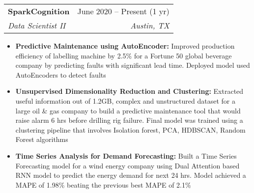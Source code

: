 \documentclass[letterpaper,12pt, margin=2in]{article}
\makeatletter
\newcommand{\resumeItem}[1]{
  \item\small{
    {#1 \vspace{-2pt}}
  }
}
\newcommand{\resumeSubheading}[4]{
  \vspace{-2pt}\item
    \begin{tabular*}{0.97\textwidth}[t]{l@{\extracolsep{\fill}}r}
      \textbf{#1} & #2 \\
      \textit{\small#3} & \textit{\small #4} \\
    \end{tabular*}\vspace{-8pt}
}
\newcommand{\resumeItemListStart}{\begin{itemize}}
\newcommand{\resumeItemListEnd}{\end{itemize}\vspace{-8pt}}
\makeatother
\begin{document}
    \resumeSubheading
      {SparkCognition}{June 2020 -- Present (1 yr)}
      {Data Scientist II}{Austin, TX}
      \resumeItemListStart
        \resumeItem{\textbf{Predictive Maintenance using AutoEncoder:} Improved production efficiency of labelling machine by 2.5\% for a Fortune 50 global beverage company by predicting faults with significant lead time. Deployed model used AutoEncoders to detect faults}
        \resumeItem{\textbf{Unsupervised Dimensionality Reduction and Clustering: }Extracted useful information out of 1.2GB, complex and unstructured dataset for a large oil & gas company to build a predictive maintenance tool that would raise alarm 6 hrs before drilling rig failure. Final model was trained using a clustering pipeline that involves Isolation forest, PCA, HDBSCAN, Random Forest algorithms}
        \resumeItem{\textbf{Time Series Analysis for Demand Forecasting: }Built a Time Series Forecasting model for a wind energy company using Dual Attention based RNN model to predict the energy demand for next 24 hrs. Model achieved a MAPE of 1.98\% beating the previous best MAPE of 2.1\%}
            \vspace{0.05in}
      \resumeItemListEnd
\end{document}
